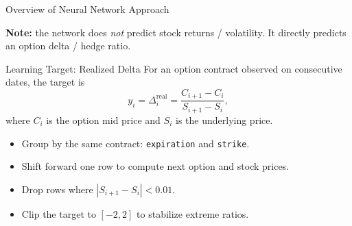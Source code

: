 \documentclass[aspectratio=169,11pt]{beamer}
\begin{document}

\begin{frame}{Overview of Neural Network Approach}

\begin{center}
\end{center}

\vspace{0.15cm}
\textbf{Note:} the network does \emph{not} predict stock returns / volatility. It directly predicts an option delta / hedge ratio.

\end{frame}
\begin{frame}{Learning Target: Realized Delta}
For an option contract observed on consecutive dates, the target is
\[
  y_i = \Delta^{\mathrm{real}}_i
  = \frac{C_{i+1}-C_i}{S_{i+1}-S_i},
\]
where $C_i$ is the option mid price and $S_i$ is the underlying price.

\vspace{0.25cm}
\begin{itemize}
  \item Group by the same contract: \texttt{expiration} and \texttt{strike}.
  \item Shift forward one row to compute next option and stock prices.
  \item Drop rows where $|S_{i+1}-S_i| < 0.01$.
  \item Clip the target to $[-2,2]$ to stabilize extreme ratios.
\end{itemize}

\end{frame}
\end{document}
